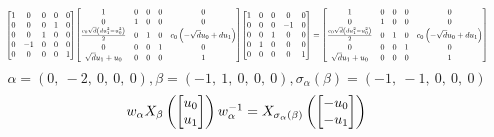\documentclass[11pt]{article}
\theoremstyle{definition}
\begin{document}
\[
\scaletoalign{\textwidth}{{\left[\begin{matrix}1 & 0 & 0 & 0 & 0\\0 & 0 & 0 & 1 & 0\\0 & 0 & 1 & 0 & 0\\0 & -1 & 0 & 0 & 0\\0 & 0 & 0 & 0 & 1\end{matrix}\right]} {\left[\begin{matrix}1 & 0 & 0 & 0 & 0\\0 & 1 & 0 & 0 & 0\\\frac{c_{0} \sqrt{d} \left(d u_{1}^{2} - u_{0}^{2}\right)}{2} & 0 & 1 & 0 & c_{0} \left(- \sqrt{d} u_{0} + d u_{1}\right)\\0 & 0 & 0 & 1 & 0\\\sqrt{d} u_{1} + u_{0} & 0 & 0 & 0 & 1\end{matrix}\right]} {\left[\begin{matrix}1 & 0 & 0 & 0 & 0\\0 & 0 & 0 & -1 & 0\\0 & 0 & 1 & 0 & 0\\0 & 1 & 0 & 0 & 0\\0 & 0 & 0 & 0 & 1\end{matrix}\right]} = {\left[\begin{matrix}1 & 0 & 0 & 0 & 0\\0 & 1 & 0 & 0 & 0\\\frac{c_{0} \sqrt{d} \left(d u_{1}^{2} - u_{0}^{2}\right)}{2} & 0 & 1 & 0 & c_{0} \left(- \sqrt{d} u_{0} + d u_{1}\right)\\0 & 0 & 0 & 1 & 0\\\sqrt{d} u_{1} + u_{0} & 0 & 0 & 0 & 1\end{matrix}\right]}}
\]
\[
\alpha = \left( 0, \  -2, \  0, \  0, \  0\right), \beta = \left( -1, \  1, \  0, \  0, \  0\right), \sigma_{\alpha}(\beta) = \left( -1, \  -1, \  0, \  0, \  0\right)
\]
\[
\scaletoalign{\textwidth}{w_{\alpha} X_{\beta}\left(\left[\begin{matrix}u_{0}\\u_{1}\end{matrix}\right]\right) w_{\alpha}^{-1} = X_{\sigma_{\alpha}\left(\beta\right)}\left(\left[\begin{matrix}- u_{0}\\- u_{1}\end{matrix}\right]\right)}
\]
\end{document}
